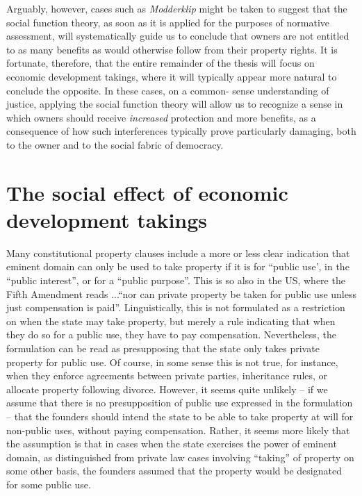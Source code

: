 Arguably, however, cases such as {\it Modderklip} might be taken to suggest that the social function theory, as soon as it is applied for the purposes of normative assessment, will systematically guide us to conclude that owners are not entitled to as many benefits as would otherwise follow from their property rights. It is fortunate, therefore, that the entire remainder of the thesis will focus on economic development takings, where it will typically appear more natural to conclude the opposite. In these cases, on a common- sense understanding of justice, applying the social function theory will allow us to recognize a sense in which owners should receive {\it increased} protection and more benefits, as a consequence of how such interferences typically prove particularly damaging, both to the owner and to the social fabric of democracy. 

\section{The social effect of economic development takings}

Many constitutional property clauses include a more or less clear indication that eminent domain can only be used to take property if it is for ``public use', in the ``public interest'', or for a ``public purpose''. This is so also in the US, where the Fifth Amendment reads 
...``nor can private property be taken for public use unless just compensation is paid''.  Linguistically, this is not formulated as a restriction on when the state may take property, but merely a rule indicating that when they do so for a public use, they have to pay compensation. Nevertheless, the formulation can be read as presupposing that the state only takes private property for public use. Of course, in some sense this is not true, for instance, when they enforce agreements between private parties, inheritance rules, or allocate property following divorce. However, it seems quite unlikely -- if we assume that there is no presupposition of public use expressed in the formulation -- that the founders should intend the state to be able to take property at will for non-public uses, without paying compensation. Rather, it seems more likely that the assumption is that in cases when the state exercises the power of eminent domain, as distinguished from private law cases involving ``taking'' of property on some other basis, the founders assumed that the property would be designated for some public use.

